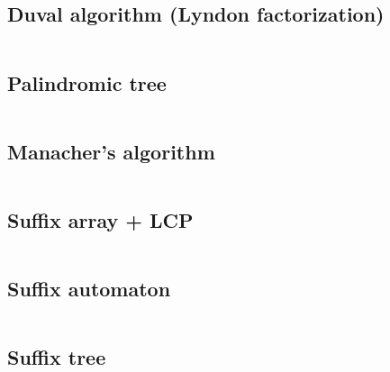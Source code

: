 \documentclass{article}
\begin{document}
\subsection{Duval algorithm (Lyndon factorization)}
\inputminted[mathescape, breaklines, breakafter=(, tabsize=2, frame=lines, showtabs, tab=|\ , tabcolor=lightgray]{c++}{./strings/duval/duval.cpp}
\subsection{Palindromic tree}
\inputminted[mathescape, breaklines, breakafter=(, tabsize=2, frame=lines, showtabs, tab=|\ , tabcolor=lightgray]{c++}{./strings/eertree/eertree.cpp}
\subsection{Manacher's algorithm}
\inputminted[mathescape, breaklines, breakafter=(, tabsize=2, frame=lines, showtabs, tab=|\ , tabcolor=lightgray]{c++}{./strings/manacher/manacher.cpp}
\subsection{Suffix array + LCP}
\inputminted[mathescape, breaklines, breakafter=(, tabsize=2, frame=lines, showtabs, tab=|\ , tabcolor=lightgray]{c++}{./strings/suff-array/suff-array.cpp}
\subsection{Suffix automaton}
\inputminted[mathescape, breaklines, breakafter=(, tabsize=2, frame=lines, showtabs, tab=|\ , tabcolor=lightgray]{c++}{./strings/suff-automaton/suff-automaton.cpp}
\subsection{Suffix tree}
\inputminted[mathescape, breaklines, breakafter=(, tabsize=2, frame=lines, showtabs, tab=|\ , tabcolor=lightgray]{c++}{./strings/suff-tree/suff-tree.cpp}


\onecolumn


\end{document}
